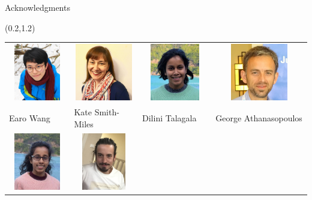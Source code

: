 \documentclass[14pt,ignorenonframetext,]{beamer}
\begin{document}
\begin{frame}{Acknowledgments}
\protect\hypertarget{acknowledgments}{}

\begin{textblock}{12.5}(0.2,1.2)
\begin{block}{}\fontsize{9}{10}\sf
\centering\begin{tabular}{p{2.4cm}p{2.9cm}p{2.6cm}p{3.2cm}}
\includegraphics[height=2.5cm, width=10cm, keepaspectratio]{earowang} &
\includegraphics[height=2.5cm, width=10cm, keepaspectratio]{kate} &
\includegraphics[height=2.5cm, width=10cm, keepaspectratio]{dilini} &
\includegraphics[height=2.5cm, width=10cm, keepaspectratio]{george}\\
Earo Wang  & Kate Smith-Miles & Dilini Talagala & George Athanasopoulos\\
\includegraphics[height=2.5cm, width=10cm, keepaspectratio]{thiyanga} &
\includegraphics[height=2.5cm, width=10cm, keepaspectratio]{pablo} &

\end{tabular}
\end{block}
\end{textblock}
\end{frame}
\end{document}
